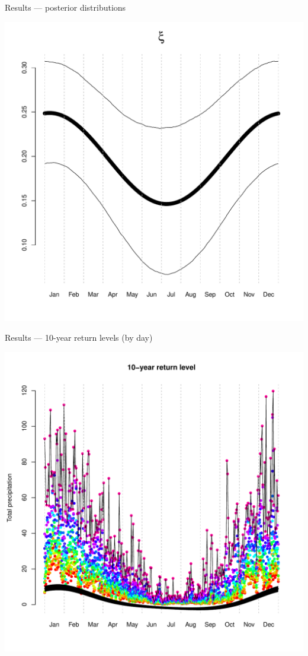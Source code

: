 \documentclass[mathserif, 11pt, t]{beamer}
\begin{document}
\begin{frame}{Results --- posterior distributions}
\begin{center}
\includegraphics[scale=0.30]{../figs/post_ksi.pdf}
\end{center}
\end{frame}

\begin{frame}{Results --- 10-year return levels (by day)}
\begin{center}
\includegraphics[scale=0.30]{../figs/return10.pdf}
\end{center}
\end{frame}
\end{document}
